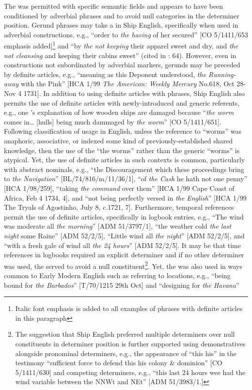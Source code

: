 The  was permitted with specific semantic fields and appears to have been conditioned by adverbial  phrases and to avoid null categories in the determiner position. Gerund phrases may take a  in Ship English, specifically when used in adverbial constructions, e.g., “order to \textit{the having} of her secured” [CO 5/1411/653 emphasis added]\footnote{Italic font emphasis is added to all examples of  phrases with definite articles in this paragraph} and “by \textit{the not keeping} their apparel sweet and dry, and \textit{the not cleansing} and keeping their cabins sweet” (cited in \citealt{Brown2011}: 64). However, even in constructions not subordinated by adverbial markers, gerunds may be preceded by definite articles, e.g., “meaning as this Deponent understood, \textit{the Running-away} with the Pink” [HCA 1/99 \textit{The American: Weekly Mercury} No.618, Oct 28-Nov 4 1731]. In addition to using definite articles with  phrases, Ship English also permits the use of definite articles with newly-introduced and generic referents, e.g., one ’s explanation of how wooden ships are damaged because “\textit{the worm} comes in… [hulls] being much dammaged by \textit{the worm}” [CO 5/1411/651]. Following  classification of  usage in English, unless the reference to “worms” was anaphoric, associative, or indexed some kind of previously-established shared knowledge, then the use of the   “the worms” rather than the generic  “worms” is atypical. Yet, the use of definite articles in such contexts is common, particularly with abstract nominals, e.g., “the Discouragement which these proceedings bring to \textit{the Navigation}” [BL/74/816/m/11/36/1], “of \textit{the Cash} he hath not one penny” [HCA 1/98/259], “taking \textit{the command} over them” [HCA 1/99 Cape Coast of Africa, Feb 4 1734, 4], and “not being perfectly versed in \textit{the English}” [HCA 1/99 The Tryals of Agostinho, July 8, c.1721, 7]. Furthermore, temporal references permit the use of definite articles, specifically in logbook entries, e.g., “The wind was moderate all \textit{the morning}” [ADM 51/3797/1], “the weather cold \textit{the last night} some Raine” [ADM 52/2/5], “Little wind all \textit{the night}” [ADM 52/2/5], and “with a fresh gale of wind all \textit{the 24 hours}” [ADM 52/2/5]. It may be that time references in logbooks required an explicit determiner and if no other determiner was used, the  served to avoid a null constituent\footnote{The suggestion that Ship English preferred multiple determiners over null constituents in determiner position is further supported using demonstratives alongside  pronominal determiners, e.g., the appearance of “this his” in the testimony “sufficient force to defend this his colony \& dominion” [CO 5/1411/630] and competing determiners, e.g., “this last 24 hours wee had the wind variable between the NNWt and NEt” [ADM 51/3983/1.]}. Yet, the  was also used in ways common to Early Modern English such as referring to locations, e.g., “being bound for \textit{the Barbados}” [T/70/1215 29th Oct] and “designing for \textit{the Havana}” 